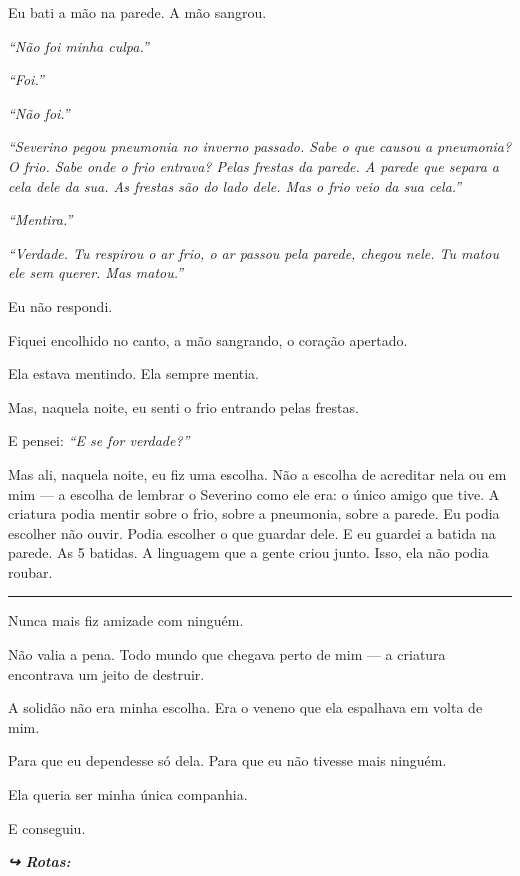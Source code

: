 \noindent Eu bati a mão na parede. A mão sangrou.

\noindent \textit{\textquotedblleft{}Não foi minha culpa.\textquotedblright{}}

\noindent \textit{\textquotedblleft{}Foi.\textquotedblright{}}

\noindent \textit{\textquotedblleft{}Não foi.\textquotedblright{}}

\noindent \textit{\textquotedblleft{}Severino pegou pneumonia no inverno passado. Sabe o que causou a pneumonia? O frio. Sabe onde o frio entrava? Pelas frestas da parede. A parede que separa a cela dele da sua. As frestas são do lado dele. Mas o frio veio da sua cela.\textquotedblright{}}

\noindent \textit{\textquotedblleft{}Mentira.\textquotedblright{}}

\noindent \textit{\textquotedblleft{}Verdade. Tu respirou o ar frio, o ar passou pela parede, chegou nele. Tu matou ele sem querer. Mas matou.\textquotedblright{}}

\noindent Eu não respondi.

\noindent Fiquei encolhido no canto, a mão sangrando, o coração apertado.

\noindent Ela estava mentindo.
Ela sempre mentia.

\noindent Mas, naquela noite, eu senti o frio entrando pelas frestas.

\noindent E pensei: \textit{\textquotedblleft{}E se for verdade?\textquotedblright{}}

\noindent Mas ali, naquela noite, eu fiz uma escolha. Não a escolha de acreditar nela ou em mim — a escolha de lembrar o Severino como ele era: o único amigo que tive. A criatura podia mentir sobre o frio, sobre a pneumonia, sobre a parede. Eu podia escolher não ouvir. Podia escolher o que guardar dele. E eu guardei a batida na parede. As 5 batidas. A linguagem que a gente criou junto. Isso, ela não podia roubar.

\vspace{0.5em}\noindent\rule{\textwidth}{0.5pt}\vspace{0.5em}

\noindent Nunca mais fiz amizade com ninguém.

\noindent Não valia a pena.
Todo mundo que chegava perto de mim --- a criatura encontrava um jeito de destruir.

\noindent A solidão não era minha escolha.
Era o veneno que ela espalhava em volta de mim.

\noindent Para que eu dependesse só dela.
Para que eu não tivesse mais ninguém.

\noindent Ela queria ser minha única companhia.

\noindent E conseguiu.

\vspace{0.5em}
\noindent\textit{\textbf{↪ Rotas:}  \rotasep {}}